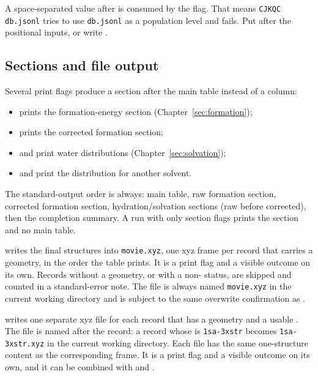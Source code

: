 \begin{warning}
A space-separated value after  is consumed by the flag. That means
\texttt{CJKQC}  \texttt{db.jsonl} tries to use \texttt{db.jsonl} as a population
level and fails. Put  after the positional inputs, or write
.
\end{warning}

\subsection{Sections and file output}\label{sec:sections-output}

Several print flags produce a section after the main table instead of a
column:

\begin{itemize}
  \item {} prints the formation-energy section
        (Chapter~\ref{sec:formation});
  \item {} prints the corrected formation section;
  \item {} and  print water
        distributions (Chapter~\ref{sec:solvation});
  \item {} and  print the
        distribution for another solvent.
\end{itemize}

The standard-output order is always: main table, raw formation section,
corrected formation section, hydration/solvation sections (raw before
corrected), then the completion summary. A run with only section flags prints
the section and no main table.

 writes the final structures into \texttt{movie.xyz}, one xyz
frame per  record that carries a geometry, in the order the table
prints. It is a print flag and a visible outcome on its own. Records without
a geometry, or with a non- status, are skipped and counted in a
standard-error note. The file is always named \texttt{movie.xyz} in the
current working directory and is subject to the same overwrite confirmation
as .

 writes one separate xyz file for each  record that
has a geometry and a usable . The file is named after the
record: a record whose  is \texttt{1sa-3xstr} becomes
\texttt{1sa-3xstr.xyz} in the current working directory. Each file has the
same one-structure content as the corresponding  frame. It is a
print flag and a visible outcome on its own, and it can be combined with
 and .

